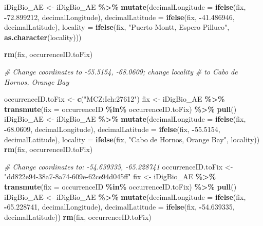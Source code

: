 \documentclass[sn-apa,pdflatex]{sn-jnl}
\newenvironment{Shaded}{\begin{snugshade}}{\end{snugshade}}
\newcommand{\AttributeTok}[1]{\textcolor[rgb]{0.13,0.29,0.53}{#1}}
\newcommand{\CommentTok}[1]{\textcolor[rgb]{0.56,0.35,0.01}{\textit{#1}}}
\newcommand{\FloatTok}[1]{\textcolor[rgb]{0.00,0.00,0.81}{#1}}
\newcommand{\FunctionTok}[1]{\textcolor[rgb]{0.13,0.29,0.53}{\textbf{#1}}}
\newcommand{\NormalTok}[1]{#1}
\newcommand{\OtherTok}[1]{\textcolor[rgb]{0.56,0.35,0.01}{#1}}
\newcommand{\SpecialCharTok}[1]{\textcolor[rgb]{0.81,0.36,0.00}{\textbf{#1}}}
\newcommand{\StringTok}[1]{\textcolor[rgb]{0.31,0.60,0.02}{#1}}
\begin{document}
\begin{Shaded}
\begin{Highlighting}[]
\NormalTok{iDigBio\_AE }\OtherTok{\textless{}{-}}\NormalTok{ iDigBio\_AE }\SpecialCharTok{\%\textgreater{}\%}
    \FunctionTok{mutate}\NormalTok{(}\AttributeTok{decimalLongitude =} \FunctionTok{ifelse}\NormalTok{(fix, }\SpecialCharTok{{-}}\FloatTok{72.899212}\NormalTok{, decimalLongitude),}
        \AttributeTok{decimalLatitude =} \FunctionTok{ifelse}\NormalTok{(fix, }\SpecialCharTok{{-}}\FloatTok{41.486946}\NormalTok{, decimalLatitude),}
        \AttributeTok{locality =} \FunctionTok{ifelse}\NormalTok{(fix, }\StringTok{"Puerto Montt, Espero Pilluco"}\NormalTok{,}
            \FunctionTok{as.character}\NormalTok{(locality)))}

\FunctionTok{rm}\NormalTok{(fix, occurrenceID.toFix)}

\CommentTok{\# Change coordinates to {-}55.5154, {-}68.0609; change locality}
\CommentTok{\# to \textquotesingle{}Cabo de Hornos, Orange Bay\textquotesingle{}}

\NormalTok{occurrenceID.toFix }\OtherTok{\textless{}{-}} \FunctionTok{c}\NormalTok{(}\StringTok{"MCZ:Ich:27612"}\NormalTok{)}
\NormalTok{fix }\OtherTok{\textless{}{-}}\NormalTok{ iDigBio\_AE }\SpecialCharTok{\%\textgreater{}\%}
    \FunctionTok{transmute}\NormalTok{(}\AttributeTok{fix =}\NormalTok{ occurrenceID }\SpecialCharTok{\%in\%}\NormalTok{ occurrenceID.toFix) }\SpecialCharTok{\%\textgreater{}\%}
    \FunctionTok{pull}\NormalTok{()}
\NormalTok{iDigBio\_AE }\OtherTok{\textless{}{-}}\NormalTok{ iDigBio\_AE }\SpecialCharTok{\%\textgreater{}\%}
    \FunctionTok{mutate}\NormalTok{(}\AttributeTok{decimalLongitude =} \FunctionTok{ifelse}\NormalTok{(fix, }\SpecialCharTok{{-}}\FloatTok{68.0609}\NormalTok{, decimalLongitude),}
        \AttributeTok{decimalLatitude =} \FunctionTok{ifelse}\NormalTok{(fix, }\SpecialCharTok{{-}}\FloatTok{55.5154}\NormalTok{, decimalLatitude),}
        \AttributeTok{locality =} \FunctionTok{ifelse}\NormalTok{(fix, }\StringTok{"Cabo de Hornos, Orange Bay"}\NormalTok{,}
\NormalTok{            locality))}
\FunctionTok{rm}\NormalTok{(fix, occurrenceID.toFix)}

\CommentTok{\# Change coordinates to: {-}54.639335, {-}65.228741}
\NormalTok{occurrenceID.toFix }\OtherTok{\textless{}{-}} \StringTok{"dd822e94{-}38a7{-}8a74{-}609e{-}62ce94d045ff"}
\NormalTok{fix }\OtherTok{\textless{}{-}}\NormalTok{ iDigBio\_AE }\SpecialCharTok{\%\textgreater{}\%}
    \FunctionTok{transmute}\NormalTok{(}\AttributeTok{fix =}\NormalTok{ occurrenceID }\SpecialCharTok{\%in\%}\NormalTok{ occurrenceID.toFix) }\SpecialCharTok{\%\textgreater{}\%}
    \FunctionTok{pull}\NormalTok{()}
\NormalTok{iDigBio\_AE }\OtherTok{\textless{}{-}}\NormalTok{ iDigBio\_AE }\SpecialCharTok{\%\textgreater{}\%}
    \FunctionTok{mutate}\NormalTok{(}\AttributeTok{decimalLongitude =} \FunctionTok{ifelse}\NormalTok{(fix, }\SpecialCharTok{{-}}\FloatTok{65.228741}\NormalTok{, decimalLongitude),}
        \AttributeTok{decimalLatitude =} \FunctionTok{ifelse}\NormalTok{(fix, }\SpecialCharTok{{-}}\FloatTok{54.639335}\NormalTok{, decimalLatitude))}
\FunctionTok{rm}\NormalTok{(fix, occurrenceID.toFix)}


\end{Highlighting}
\end{Shaded}
\end{document}
